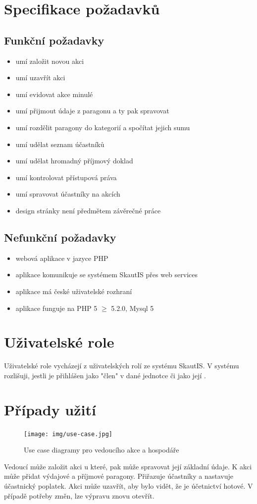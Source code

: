 \documentclass[thesis=B,czech]{FITthesis}[2011/06/14]
\begin{document}
\section{Specifikace požadavků}
\subsection{Funkční požadavky}
\begin{itemize}
	\item umí založit novou akci
	\item umí uzavřít akci
	\item umí evidovat akce minulé
	\item umí přijmout údaje z paragonu a ty pak spravovat
	\item umí rozdělit paragony do kategorií a spočítat jejich sumu
	\item umí udělat seznam účastníků
	\item umí udělat hromadný příjmový doklad
	\item umí kontrolovat přístupová práva
	\item umí spravovat účastníky na akcích
	\item design stránky není předmětem závěrečné práce
\end{itemize}

\subsection{Nefunkční požadavky}
\begin{itemize}
	\item webová aplikace v jazyce PHP
	\item aplikace komunikuje se systémem SkautIS přes web services
	\item aplikace má české uživatelské rozhraní
	\item aplikace funguje na PHP 5 $\geq$ 5.2.0, Mysql 5
\end{itemize}

\section{Uživatelské role}
Uživatelské role vycházejí z uživatelských rolí ze systému SkautIS. V systému rozlišuji, jestli je přihlášen jako "člen" v dané jednotce či jako její .

\section{Případy užití}
\begin{figure}[h]\centering
 	\texttt{[image: img/use-case.jpg]}
 	\caption[Případy užití]{Use case diagramy pro vedoucího akce a hospodáře}\label{fig:use-case}
\end{figure}
Vedoucí může založit akci u které, pak může spravovat její základní údaje. K akci může přidat výdajové a příjmové paragony. Přiřazuje účastníky a nastavuje účastnický poplatek. Akci může uzavřít, aby bylo vidět, že je účetnictví hotové. V případě potřeby změn, lze výpravu znovu otevřít.
\end{document}
